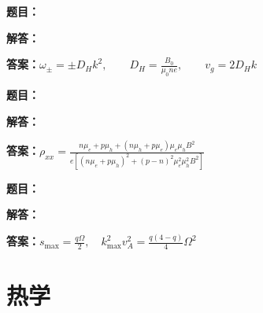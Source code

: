\documentclass[lang=cn,color=blue,11pt]{elegantbook}
\begin{document}
\par
\noindent\textbf{题目：}
\par\noindent\textbf{解答：}
\par\noindent\textbf{答案：}\(\displaystyle \omega_\pm=\pm D_Hk^2,\qquad D_H=\frac{B_0}{\mu_0ne},\qquad v_g=2D_H k\)\par
\par\smallskip\noindent\hrulefill\par\medskip
{}\par
\noindent\textbf{题目：}
\par\noindent\textbf{解答：}
\par\noindent\textbf{答案：}\(\displaystyle \rho_{xx}=\frac{n\mu_e+p\mu_h+(n\mu_h+p\mu_e)\mu_e\mu_hB^2}{e[(n\mu_e+p\mu_h)^2+(p-n)^2\mu_e^2\mu_h^2B^2]}\)\par
\par\smallskip\noindent\hrulefill\par\medskip
{}\par
\noindent\textbf{题目：}
\par\noindent\textbf{解答：}
\par\noindent\textbf{答案：}\(\displaystyle s_{\max}=\frac{q\Omega}{2},\quad k_{\max}^2v_A^2=\frac{q(4-q)}4\Omega^2\)\par
\par\smallskip\noindent\hrulefill\par\medskip
\chapter{热学}
\end{document}

